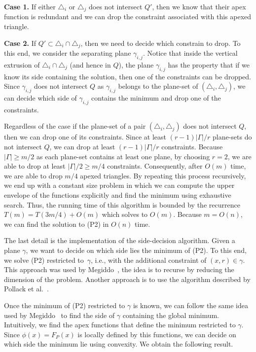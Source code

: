 \documentclass[a4paper,UKenglish]{lipics}
\newcommand{\F}[2]{\ensuremath{F_{\scriptscriptstyle #1}(#2)}}
\begin{document}
\textbf{Case 1.} If either $\triangle_i$ or $\triangle_j$ does not intersect $Q'$, then we know that their apex function is redundant and we can drop the constraint associated with this apexed triangle.

\textbf{Case 2.} If $Q'\subset \triangle_i\cap \triangle_j$, then we need to decide which constrain to drop. 
To this end, we consider the separating plane $\gamma_{i,j}$. Notice that inside the vertical extrusion of $\triangle_i\cap \triangle_j$ (and hence in $Q$), the plane $\gamma_{i,j}$ has the property that if we know its side containing the solution, then one of the constraints can be dropped. Since $\gamma_{i,j}$ does not intersect $Q$ as $\gamma_{i,j}$ belongs to the plane-set of $(\triangle_i, \triangle_j)$, we can decide which side of $\gamma_{i,j}$ contains the minimum and drop one of the constraints.
\vspace{.05in}

Regardless of the case if the plane-set of a pair $(\triangle_i, \triangle_j)$ does not intersect $Q$, then we can drop one of its constraints. Since at least $(r-1)|\Gamma|/r$ plane-sets do not intersect $Q$, we can drop at least $(r-1)|\Gamma|/r$ constraints.
Because $|\Gamma| \geq m/2$ as each plane-set contains at least one plane, by choosing $r = 2$, we are able to drop at least $|\Gamma|/2 \geq m/4$ constraints.
Consequently, after $O(m)$ time, we are able to drop $m/4$ apexed triangles.
By repeating this process recursively, we end up with a constant size problem in which we can compute the upper envelope of the functions explicitly and find the minimum using exhaustive search. 
Thus, the running time of this algorithm is bounded by the recurrence $T(m) = T(3m/4) + O(m)$ which solves to $O(m)$. 
Because $m = O(n)$, we can find the solution to (P2) in $O(n)$ time.

The last detail is the implementation of the side-decision algorithm. 
Given a plane $\gamma$, we want to decide on which side lies the minimum of (P2).
To this end, we solve (P2) restricted to~$\gamma$, i.e., with the additional constraint of $(x,r)\in \gamma$. 
This approach was used by Megiddo~\cite{megiddo1989ball}, the idea is to recurse by reducing the dimension of the problem.
Another approach is to use the algorithm described by Pollack et al.~\cite[Section~3]{pollackComputingCenter}. 

Once the minimum of (P2) restricted to $\gamma$ is known, we can follow the same idea used by Megiddo~\cite{megiddo1989ball} to find the side of $\gamma$ containing the global minimum. 
Intuitively, we find the apex functions that define the minimum restricted to $\gamma$. Since $\phi(x) = \F{P}{x}$ is locally defined by this functions, we can decide on which side the minimum lie using convexity.
We obtain the following result.
\end{document}
